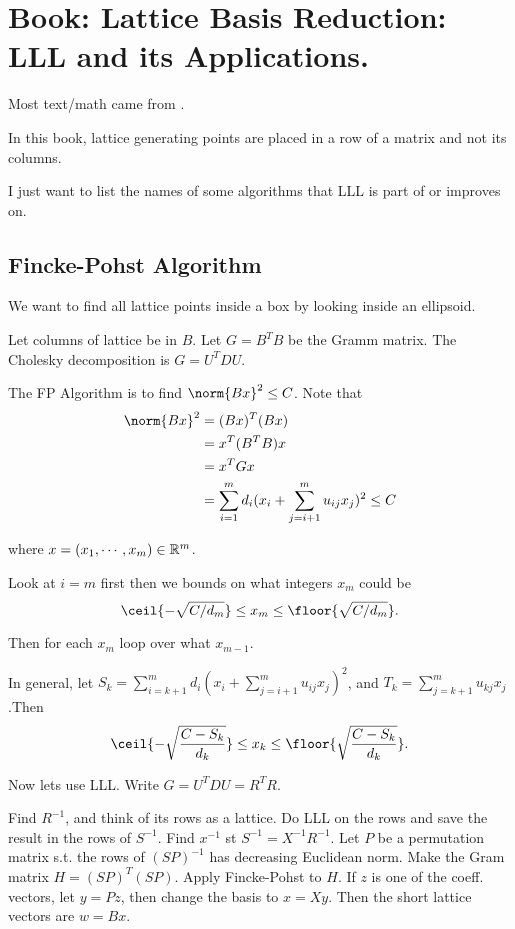 \chapter{Book: Lattice Basis Reduction: LLL and its Applications.}

Most text/math came from \cite{bremnerLatticeBasisReduction}.

In this book, lattice generating points are placed in a row of a matrix and not its columns.

I just want to list the names of some algorithms that LLL is part of or improves on.

\section{Fincke-Pohst Algorithm}
We want to find all lattice points inside a box by looking inside an ellipsoid.

Let columns of lattice be in $B$. Let $G=B^TB$ be the Gramm matrix. The Cholesky decomposition is $G=U^TDU$.

The FP Algorithm is to find $\norm{Bx}^2 \leq C$. Note that
\begin{align*}
	\norm{Bx}^2 & = (Bx)^T(Bx) \\
	& = x^T(B^TB)x  \\
	& = x^TGx \\
	& = \sum_{i=1}^m d_i(x_i + \sum_{j=i+1}^m u_{ij}x_j)^2 \leq C
\end{align*}

where $x=(x_1, \cdots, x_m) \in \mathbb R^m$.

Look at $i=m$ first then  we bounds on what integers $x_m$ could be
\[
	\ceil{-\sqrt{C/d_m}} \leq x_m \leq \floor{\sqrt{C/d_m}}.
\]

Then for each $x_m$ loop over what $x_{m-1}$.

In general, let $S_k = \sum\limits_{i=k+1}^m d_i(x_i + \sum\limits_{j=i+1}^m u_{ij}x_j)^2$, 
and $T_k = \sum\limits_{j=k+1}^m u_{kj}x_j$.Then
\[
	\ceil{-\sqrt{\frac{C-S_k}{d_k}}} \leq x_k \leq \floor{\sqrt{\frac{C-S_k}{d_k}}}.
\]

Now lets use LLL. Write $G=U^TDU=R^TR$.

Find $R^{-1}$, and think of its rows as a lattice. Do LLL on the rows and save the result in the rows of $S^{-1}$. Find $x^{-1}$ st $S^{-1}=X^{-1}R^{-1}$. Let $P$ be a permutation matrix s.t. the rows of $(SP)^{-1}$ has decreasing Euclidean norm. Make the Gram matrix $H =(SP)^T(SP)$. Apply Fincke-Pohst  to $H$. If $z$ is one of the coeff. vectors, let  $y=Pz$, then change the  basis  to $x=Xy$. Then the short lattice vectors are $w=Bx$.

